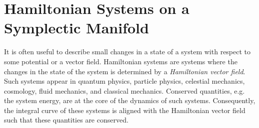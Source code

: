 %

 

\section{Hamiltonian Systems on a Symplectic Manifold} \label{section:2.3}
It is often useful to describe small changes in a state of a system with respect to some potential or a vector field. Hamiltonian systems are systems where the changes in the state of the system is determined by a \emph{Hamiltonian vector field}. Such systems appear in quantum physics, particle physics, celestial mechanics, cosmology, fluid mechanics, and classical mechanics. Conserved quantities, e.g. the system energy, are at the core of the dynamics of such systems. Consequently, the integral curve of these systems is aligned with the Hamiltonian vector field such that these quantities are conserved.

